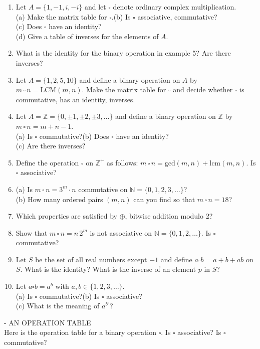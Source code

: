\documentclass[12pt]{book}
\theoremstyle{definition}
\def\Z{\mathbb{Z}}
\begin{document}
\begin{enumerate}
\item Let $A=\{1,-1,i,-i\}$ and let $\square$ denote ordinary complex multiplication.\\
(a) Make the matrix table for $\square$.\qquad (b) Is $\square$ associative, commutative?\\
(c) Does $\square$ have an identity?\\
(d) Give a table of inverses for the elements of $A$.
\item What is the identity for the binary operation in example 5?  Are there inverses?
\item Let $A=\{1,2,5,10\}$ and define a binary operation on $A$ by $m\,\square\,n = \text{LCM}(m,n)$.  Make the matrix table for $\square$ and decide whether $\square$ is commutative, has an identity, inverses.
\item Let $A=\Z=\{0,\pm1, \pm2,\pm3,\dots\}$ and define a binary operation on $\Z$ by $m\,\square\,n=m+n-1$.\\
(a) Is $\square$ commutative?\qquad (b) Does $\square$ have an identity?\\
(c) Are there inverses?
\item Define the operation $\square$ on $\Z^+$ as follows: $m\,\square\,n = \text{gcd}(m,n)+\text{lcm}(m,n)$.  Is $\square$ associative?
\item (a) Is $m\,\square\,n=3^m\cdot n$ commutative on $\mathbb{N}=\{0,1,2,3,\dots\}$?\\
(b) How many ordered pairs $(m,n)$ can you find so that $m\,\square\,n = 18$?
\item Which properties are satisfied by $\oplus$, bitwise addition modulo 2?
\item Show that $m\,\square\,n = n\,2^m$ is not associative on $\mathbb{N}=\{0,1,2,\dots\}$.  Is $\square$ commutative?
\item Let $ S $ be the set of all real numbers except $ -1 $ and define $ a\square b=a+b+ab $ on $ S $. What is the identity? What is the inverse of an element $ p $ in $ S $?
\item Let $ a\square b=a^b $ with $ a,b\in\{1,2,3,\dots\}. $\\
(a) Is $ \square $ commutative?\qquad (b) Is $ \square $ associative?\\
(c) What is the meaning of $ a^{b^c} $? 
\end{enumerate}
\newpage
{} - AN OPERATION TABLE\\[.2in]
Here is the operation table  for a binary operation $ \square $. Is $ \square $ associative? Is $ \square $ commutative?
\end{document}
